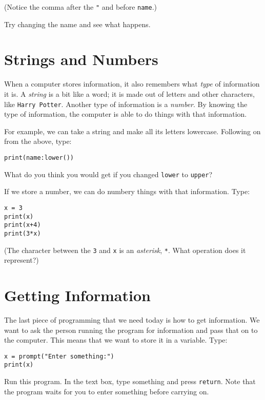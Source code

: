 \documentclass[
  xhtml,%
  text
]{internet}
\begin{document}
(Notice the comma after the \Verb+"+ and before \Verb+name+.)

Try changing the name and see what happens.

\section*{Strings and Numbers}

When a computer stores information, it also remembers what \emph{type} of information it is. 
A \emph{string} is a bit like a word; it is made out of letters and other characters, like \Verb+Harry Potter+.
Another type of information is a \emph{number}.
By knowing the type of information, the computer is able to do things with that information.

For example, we can take a string and make all its letters lowercase.
Following on from the above, type:

\begin{verbatim}
print(name:lower())
\end{verbatim}

What do you think you would get if you changed \Verb+lower+ to \Verb+upper+?

\bigskip

If we store a number, we can do numbery things with that information.
Type:

\begin{verbatim}
x = 3
print(x)
print(x+4)
print(3*x)
\end{verbatim}

(The character between the \Verb+3+ and \Verb+x+ is an \emph{asterisk}, \Verb+*+.
What operation does it represent?)

\section*{Getting Information}

The last piece of programming that we need today is how to get information.
We want to ask the person running the program for information and pass that on to the computer.
This means that we want to store it in a variable.
Type:

\begin{verbatim}
x = prompt("Enter something:")
print(x)
\end{verbatim}

Run this program.
In the text box, type something and press \Verb+return+.
Note that the program waits for you to enter something before carrying on.
\end{document}

